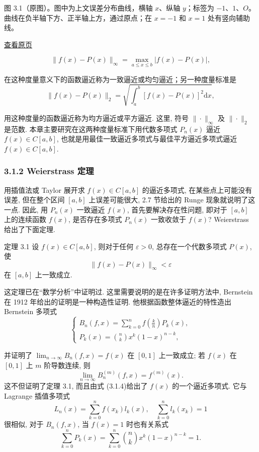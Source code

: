 \documentclass[
  10pt,
  fontset=fandol]{ctexart}
\begin{document}
图 3.1（原图）。图中为上文误差分布曲线，横轴 \(x\)、纵轴 \(y\)；标签为 \(-1\)、\(1\)、\(O\)。曲线在负半轴下方、正半轴上方，通过原点；在 \(x=-1\) 和 \(x=1\) 处有竖向辅助线。

\href{../../source-images/pdf-059.jpeg}{查看原页}

\[
\| f(x) - P(x) \|_{\infty} = \max_{a \leqslant x \leqslant b} |f(x) - P(x)|, \tag{3.1.2}
\]

在这种度量意义下的函数逼近称为一致逼近或均匀逼近；另一种度量标准是 \[
\| f(x) - P(x) \|_{2} = \sqrt{\int_{a}^{b} [f(x) - P(x)]^{2} \mathrm{d}x}, \tag{3.1.3}
\]

用这种度量的函数逼近称为均方逼近或平方逼近. 这里, 符号 \(\| \cdot \|_{\infty}\) 及 \(\| \cdot \|_{2}\) 是范数. 本章主要研究在这两种度量标准下用代数多项式 \(P_{n}(x)\) 逼近 \(f(x) \in C[a,b]\), 也就是用最佳一致逼近多项式与最佳平方逼近多项式逼近 \(f(x) \in C[a,b]\).

\subsubsection{3.1.2 Weierstrass 定理}\label{weierstrass-ux5b9aux7406}

用插值法或 Taylor 展开求 \(f(x) \in C[a,b]\) 的逼近多项式, 在某些点上可能没有误差, 但在整个区间 \([a,b]\) 上误差可能很大, 2.7 节给出的 Runge 现象就说明了这一点. 因此, 用 \(P_{n}(x)\) 一致逼近 \(f(x)\), 首先要解决存在性问题, 即对于 \([a,b]\) 上的连续函数 \(f(x)\), 是否存在多项式 \(P_{n}(x)\) 一致收敛于 \(f(x)\)? Weierstrass 给出了下面定理.

定理 3.1 设 \(f(x) \in C[a,b]\), 则对于任何 \(\varepsilon > 0\), 总存在一个代数多项式 \(P(x)\), 使 \[
\| f(x) - P(x) \|_{\infty} < \varepsilon
\] 在 \([a,b]\) 上一致成立.

这定理已在``数学分析''中证明过. 这里需要说明的是在许多证明方法中, Bernstein 在 1912 年给出的证明是一种构造性证明. 他根据函数整体逼近的特性造出 Bernstein 多项式 \[
\begin{cases} B_{n}(f,x) = \sum_{k=0}^{n} f\left(\frac{k}{n}\right) P_{k}(x), \\ P_{k}(x) = \binom{n}{k} x^{k}(1-x)^{n-k}, \end{cases} \tag{3.1.4}
\]

并证明了 \(\lim_{n \to \infty} B_{n}(f,x) = f(x)\) 在 \([0,1]\) 上一致成立; 若 \(f(x)\) 在 \([0,1]\) 上 \(m\) 阶导数连续, 则 \[
\lim_{n \to \infty} B_{n}^{(m)}(f,x) = f^{(m)}(x).
\] 这不但证明了定理 3.1, 而且由式 (3.1.4)给出了 \(f(x)\) 的一个逼近多项式. 它与 Lagrange 插值多项式 \[
L_{n}(x) = \sum_{k=0}^{n} f\left(x_{k}\right) l_{k}(x), \quad \sum_{k=0}^{n} l_{k}(x_{k}) = 1
\] 很相似, 对于 \(B_{n}(f,x)\), 当 \(f(x)=1\) 时也有关系式 \[
\sum_{k=0}^{n} P_{k}(x) = \sum_{k=0}^{n} \binom{n}{k} x^{k}(1-x)^{n-k} = 1. \tag{3.1.5}
\]
\end{document}
